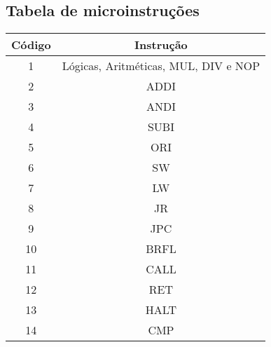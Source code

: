     		\subsection{Tabela de microinstruções}

	\begin{center}
		\begin{longtable}[pos]{| c | c |} \hline
			\multicolumn{1}{|c|}{\cellcolor[gray]{0.9}\textbf{Código}} & 
			\multicolumn{1}{c|}{\cellcolor[gray]{0.9}\textbf{Instrução}} \\ \hline 
			\endhead
			\hline
			\endlastfoot
			
	    1 & Lógicas, Aritméticas, MUL, DIV e NOP\\ \hline
            2 & ADDI \\ \hline
            3 & ANDI \\ \hline
            4 & SUBI \\ \hline
            5 & ORI \\ \hline
            6 & SW \\ \hline
            7 & LW \\ \hline
            8 & JR\\ \hline
            9 & JPC\\ \hline
            10 & BRFL\\ \hline
            11 & CALL\\ \hline
            12 & RET\\ \hline
            13 & HALT\\ \hline
            14 & CMP\\ \hline
		\end{longtable}
	\end{center}

